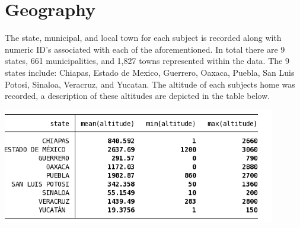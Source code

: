 \documentclass{article}
\begin{document}
\section{Geography}
The state, municipal, and local town for each subject is recorded along with numeric ID's associated with each of the aforementioned. In total there are 9 states, 661 municipalities, and 1,827 towns represented within the data. The 9 states include: Chiapas, Estado de Mexico, Guerrero, Oaxaca, Puebla, San Luis Potosi, Sinaloa, Veracruz, and Yucatan. The altitude of each subjects home was recorded, a description of these altitudes are depicted in the table below.
\begin{center}
\includegraphics[scale=.75]{altitude}

\end{center}
\end{document}
